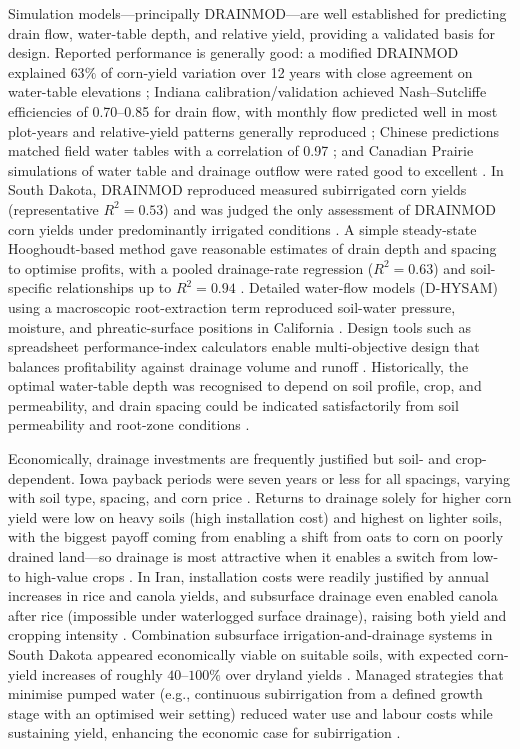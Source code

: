 Simulation models—principally DRAINMOD—are well established for predicting drain flow, water-table depth, and relative yield, providing a validated basis for design. Reported performance is generally good: a modified DRAINMOD explained \(63\%\) of corn-yield variation over 12 years with close agreement on water-table elevations \parencite{HARDJOAMIDJOJO1982}; Indiana calibration/validation achieved Nash--Sutcliffe efficiencies of 0.70--0.85 for drain flow, with monthly flow predicted well in most plot-years and relative-yield patterns generally reproduced \parencite{Ale2009,Wang2006b}; Chinese predictions matched field water tables with a correlation of 0.97 \parencite{Li2018}; and Canadian Prairie simulations of water table and drainage outflow were rated good to excellent \parencite{Cordeiro2015}. In South Dakota, DRAINMOD reproduced measured subirrigated corn yields (representative \(R^{2}=0.53\)) and was judged the only assessment of DRAINMOD corn yields under predominantly irrigated conditions \parencite{DeBoer2006}. A simple steady-state Hooghoudt-based method gave reasonable estimates of drain depth and spacing to optimise profits, with a pooled drainage-rate regression (\(R^{2}=0.63\)) and soil-specific relationships up to \(R^{2}=0.94\) \parencite{Skaggs2006}. Detailed water-flow models (D-HYSAM) using a macroscopic root-extraction term reproduced soil-water pressure, moisture, and phreatic-surface positions in California \parencite{KARAJEH1994,KARAJEH1994b}. Design tools such as spreadsheet performance-index calculators enable multi-objective design that balances profitability against drainage volume and runoff \parencite{Sands2015}. Historically, the optimal water-table depth was recognised to depend on soil profile, crop, and permeability, and drain spacing could be indicated satisfactorily from soil permeability and root-zone conditions \parencite{HOOGHOUDT1952}.

Economically, drainage investments are frequently justified but soil- and crop-dependent. Iowa payback periods were seven years or less for all spacings, varying with soil type, spacing, and corn price \parencite{Arora2024}. Returns to drainage solely for higher corn yield were low on heavy soils (high installation cost) and highest on lighter soils, with the biggest payoff coming from enabling a shift from oats to corn on poorly drained land—so drainage is most attractive when it enables a switch from low- to high-value crops \parencite{JORJANI1991}. In Iran, installation costs were readily justified by annual increases in rice and canola yields, and subsurface drainage even enabled canola after rice (impossible under waterlogged surface drainage), raising both yield and cropping intensity \parencite{DarziNaftchali2014}. Combination subsurface irrigation-and-drainage systems in South Dakota appeared economically viable on suitable soils, with expected corn-yield increases of roughly \(40\textrm{--}100\%\) over dryland yields \parencite{DeBoer2006}. Managed strategies that minimise pumped water (e.g., continuous subirrigation from a defined growth stage with an optimised weir setting) reduced water use and labour costs while sustaining yield, enhancing the economic case for subirrigation \parencite{Ale2009,Gunn2019}.

